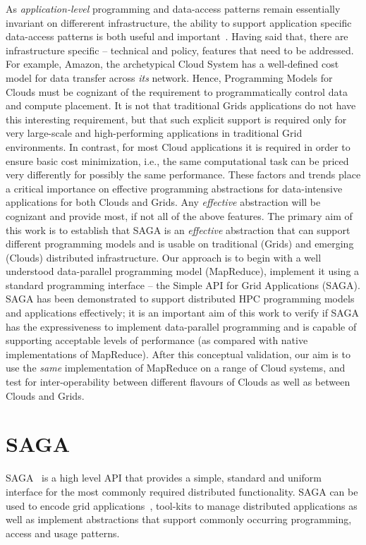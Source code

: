 \documentclass[conference,final]{IEEEtran}
\newcommand{\jhanote}[1]{ {\textcolor{red} { ***SJ: #1 }}}
\newcommand{\jhanote}[1]{}
\begin{document}
As {\it application-level} programming and data-access patterns remain
essentially invariant on differerent infrastructure, the ability to
support application specific data-access patterns is both useful and
important~\cite{dpa-paper}.  Having said that, there are
infrastructure specific -- technical and policy, features that need to
be addressed. For example, Amazon, the archetypical Cloud System has a
well-defined cost model for data transfer across {\it its}
network. Hence, Programming Models for Clouds must be cognizant of the
requirement to programmatically control data and compute placement.
It is not that traditional Grids applications do not have this
interesting requirement, but that such explicit support is required
only for very large-scale and high-performing applications in
traditional Grid environments. In contrast, for most Cloud
applications it is required in order to ensure basic cost
minimization, i.e., the same computational task can be priced very
differently for possibly the same performance.  These factors and
trends place a critical importance on effective programming
abstractions for data-intensive applications for both Clouds and Grids.
Any {\it effective} abstraction will be cognizant and provide most, if
not all of the above features. The primary aim of this work is to
establish that SAGA is an {\it effective} abstraction that can support
different programming models and is usable on traditional (Grids) and
emerging (Clouds) distributed infrastructure.  Our approach is to
begin with a well understood data-parallel programming model
(MapReduce), implement it using a standard programming interface --
the Simple API for Grid Applications (SAGA).  SAGA has been
demonstrated to support distributed HPC programming models and
applications effectively; it is an important aim of this work to
verify if SAGA has the expressiveness to implement data-parallel
programming and is capable of supporting acceptable levels of
performance (as compared with native implementations of
MapReduce). After this conceptual validation, our aim is to use the
{\it same} implementation of MapReduce on a range of Cloud systems,
and test for inter-operability between different flavours of Clouds as
well as between Clouds and Grids.



\section{SAGA}
SAGA~\cite{saga-core} is a high level API that provides a simple,
standard and uniform interface for the most commonly required
distributed functionality.  SAGA can be used to encode grid
applications~\cite{saga_escience07_short, saga_tg08}, tool-kits to manage
distributed applications as well as implement abstractions that
support commonly occurring programming, access and usage patterns.
\end{document}
